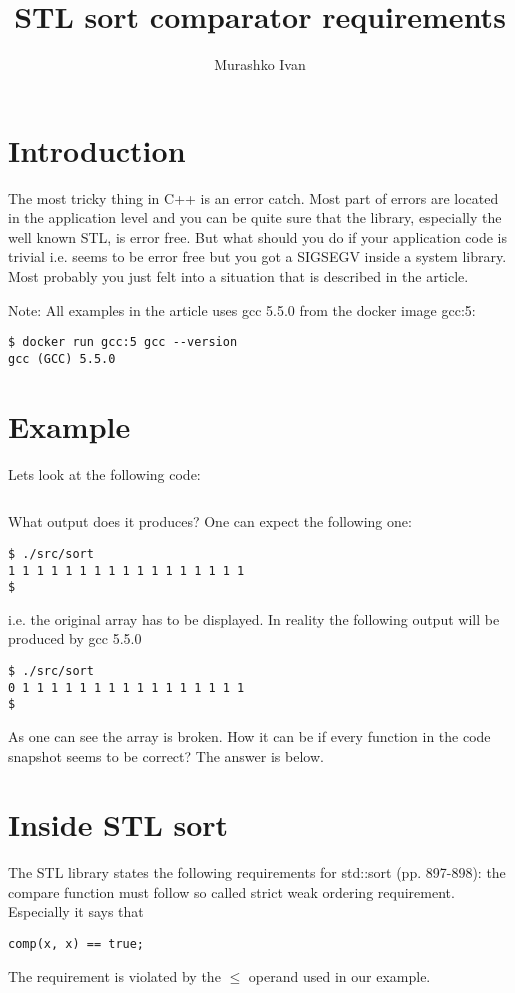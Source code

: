 \documentclass[14pt,a4paper]{article}
\title{STL sort comparator requirements}
\author{Murashko Ivan}
\date{}
\begin{document}
\maketitle

\section*{Introduction}
The most tricky thing in C++ is an error catch. Most part of errors
are located in the application level and you can be quite sure that
the library, especially the well known STL, is error free. But what
should you do if your application code is trivial i.e. seems to be
error free but you got a SIGSEGV inside a system library. Most
probably you just felt into a situation that is described in the
article. 

Note: All examples in the article uses gcc 5.5.0 from the docker image
gcc:5: 
\begin{verbatim}
$ docker run gcc:5 gcc --version
gcc (GCC) 5.5.0
\end{verbatim}


\section{Example}
Lets look at the following code:
\inputminted{c++}{./src/sort.cpp}
What output does it produces? One can expect the following one:
\begin{verbatim}
$ ./src/sort
1 1 1 1 1 1 1 1 1 1 1 1 1 1 1 1 1
$
\end{verbatim}
i.e. the original array has to be displayed. In reality the following
output will be produced by gcc 5.5.0 
\begin{verbatim}
$ ./src/sort
0 1 1 1 1 1 1 1 1 1 1 1 1 1 1 1 1
$
\end{verbatim}
As one can see the array is broken. How it can be if every
function in the code snapshot seems to be correct? The answer is
below. 

\section{Inside STL sort}

The STL library states the following requirements for std::sort 
\cite{ISO:2013:IIP}(pp. 897-898): the compare function must follow so
called strict weak ordering requirement. Especially it
says that 
\begin{verbatim}
comp(x, x) == true;
\end{verbatim}
The requirement is violated
by the $\le$ operand used in our example.  
\end{document}
